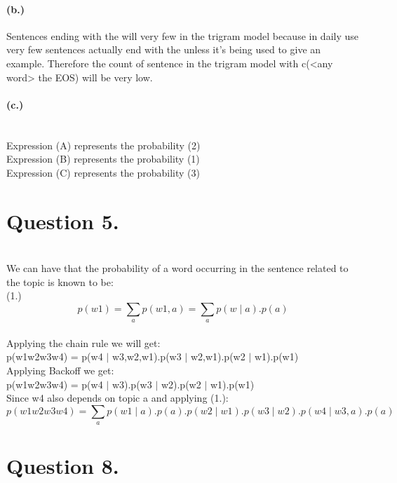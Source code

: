 \documentclass{article}
\begin{document}
\paragraph{(b.)}
Sentences ending with the will very few in the trigram model because in daily use very few sentences actually end with the unless it's being used to give an example. Therefore the count of sentence in the trigram model with c(<any word> the EOS) will be very low.
\paragraph{(c.)}
\\Expression (A) represents the probability (2)
\\Expression (B) represents the probability (1)
\\Expression (C) represents the probability (3)
\section{Question 5.}
\\We can have that the probability of a word occurring in the sentence related to the topic is known to be:
\\(1.)$$p(w1) =\sum_a p(w1,a) = \sum_a p(w \mid a).p(a)$$ 
\\Applying the chain rule we will get:
\\p(w1w2w3w4) = p(w4 $\mid$ w3,w2,w1).p(w3 $\mid$ w2,w1).p(w2 $\mid$ w1).p(w1)
\\Applying Backoff we get:
\\p(w1w2w3w4) = p(w4 $\mid$ w3).p(w3 $\mid$ w2).p(w2 $\mid$ w1).p(w1)
\\Since w4 also depends on topic a and applying (1.):
\\$$p(w1w2w3w4) = \sum_a p(w1\mid a).p(a) . p(w2 \mid w1).p(w3 \mid w2).p(w4 \mid w3,a).p(a)$$
\section{Question 8.}
\end{document}
